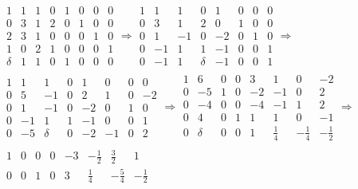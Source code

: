 \documentclass[9pt, a4paper, showtrims]{memoir}
\theoremstyle{plain}
\theoremstyle{remark}
\theoremstyle{definition}
\begin{document}
\begin{multline*}
	\begin{array}{cccc|cccc}
		\boxed{1} & 1 & 1 & 0 & 1 & 0 & 0 & 0 \\
		0         & 3 & 1 & 2 & 0 & 1 & 0 & 0 \\
		2         & 3 & 1 & 0 & 0 & 0 & 1 & 0 \\
		1         & 0 & 2 & 1 & 0 & 0 & 0 & 1 \\
		\hline
		\delta    & 1 & 1 & 0 & 1 & 0 & 0 & 0
	\end{array}\Rightarrow
	\begin{array}{cccc|cccc}
		1 & 1  & 1  & 0         & 1  & 0 & 0 & 0 \\
		0 & 3  & 1  & 2         & 0  & 1 & 0 & 0 \\
		0 & 1  & -1 & 0         & -2 & 0 & 1 & 0 \\
		0 & -1 & 1  & \boxed{1} & -1 & 0 & 0 & 1 \\
		\hline
		0 & -1 & 1  & \delta    & -1 & 0 & 0 & 1
	\end{array}\Rightarrow
	\\
	\begin{array}{cccc|cccc}
		1 & 1  & 1          & 0 & 1  & 0  & 0 & 0  \\
		0 & 5  & \boxed{-1} & 0 & 2  & 1  & 0 & -2 \\
		0 & 1  & -1         & 0 & -2 & 0  & 1 & 0  \\
		0 & -1 & 1          & 1 & -1 & 0  & 0 & 1  \\
		\hline
		0 & -5 & \delta     & 0 & -2 & -1 & 0 & 2
	\end{array}\Rightarrow
	\begin{array}{cccc|cccc}
		1 & 6          & 0 & 0 & 3  & 1           & 0            & -2           \\
		0 & -5         & 1 & 0 & -2 & -1          & 0            & 2            \\
		0 & \boxed{-4} & 0 & 0 & -4 & -1          & 1            & 2            \\
		0 & 4          & 0 & 1 & 1  & 1           & 0            & -1           \\
		\hline
		0 & \delta     & 0 & 0 & 1  & \frac{1}{4} & -\frac{1}{4} & -\frac{1}{2}
	\end{array}\Rightarrow
	\\
	\begin{array}{cccc|cccc}
		1 & 0 & 0 & 0 & -3 & -\frac{1}{2} & \frac{3}{2}  & 1            \\
		0 & 0 & 1 & 0 & 3  & \frac{1}{4}  & -\frac{5}{4} & -\frac{1}{2} \\

\end{array}
\end{multline*}
\end{document}
